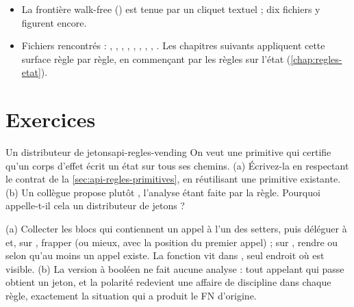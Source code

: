 \begin{resume}
\begin{itemize}
  \item La frontière walk-free () est tenue par un cliquet textuel ; dix fichiers y figurent encore.
  \item Fichiers rencontrés : , , , , , , , , . Les chapitres suivants appliquent cette surface règle par règle, en commençant par les règles sur l'état (\cref{chap:regles-etat}).
\end{itemize}
\end{resume}

\section*{Exercices}

\begin{exercice}{Un distributeur de jetons}{api-regles-vending}
On veut une primitive  qui certifie qu'un corps d'effet écrit un état sur tous ses chemins. (a) Écrivez-la en respectant le contrat de la \cref{sec:api-regles-primitives}, en réutilisant une primitive existante. (b) Un collègue propose plutôt , l'analyse étant faite par la règle. Pourquoi  appelle-t-il cela un distributeur de jetons ?
\end{exercice}
\begin{solution}
(a) Collecter les blocs qui contiennent un appel à l'un des setters, puis déléguer à  et, sur , frapper  (ou mieux,  avec la position du premier appel) ; sur , rendre  ou  selon qu'au moins un appel existe. La fonction vit dans , seul endroit où  est visible. (b) La version à booléen ne fait aucune analyse : tout appelant qui passe  obtient un jeton, et la polarité redevient une affaire de discipline dans chaque règle, exactement la situation qui a produit le FN d'origine.
\end{solution}

